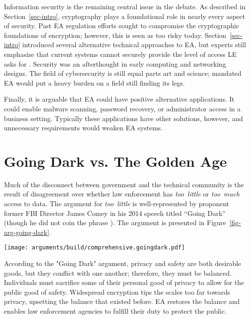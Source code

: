 \documentclass[conference]{IEEEtran}
\def\ii#1{\mbox{\textit{#1}}}
\newcommand{\myfig}[1]{Figure~\ref{#1}}
\newcommand{\mysec}[1]{Section~\ref{#1}}
\begin{document}
Information security is the remaining central issue in the debate. As described in \mysec{sec-intro}, \ac{cryptography}
plays a foundational role in nearly every aspect of security. Past \ac{EA} regulation efforts sought to compromise the
cryptographic foundations of encryption; however, this is seen as too risky today. \mysec{sec-intro} introduced several
alternative technical approaches to \ac{EA}, but experts still emphasize that current systems cannot securely provide
the level of access \acl{LE} asks for \cite{abelson_2015} \cite{abelson_risks_1997}. Security was an afterthought in
early computing and networking designs. The field of cybersecurity is still equal parts art and science; mandated
\ac{EA} would put a heavy burden on a field still finding its legs.


Finally, it is arguable that \ac{EA} could have positive alternative applications. It could enable malware scanning,
password recovery, or administrator access in a business setting. Typically these applications have other solutions,
however, and unnecessary requirements would weaken \ac{EA} systems.


\section{Going Dark vs. The Golden Age}

Much of the disconnect between government and the technical community is the result of disagreement over whether law
enforcement has \ii{too little} or \ii{too much} access to data. The argument for \ii{too little} is well-represented by
proponent former \ac{FBI} Director James Comey in his 2014 speech titled ``Going Dark'' \cite{comey_2014} (though he did
not coin the phrase \cite{swire_encryption_2011}). The argument is presented in \myfig{fig-arg-going-dark}.

\begin{figure*}[t!]
  \centering
  \texttt{[image: arguments/build/comprehensive.goingdark.pdf]}
  \caption{A ``Going Dark'' Argument Map}
  \label{fig-arg-going-dark}
\end{figure*}

According to the "Going Dark" argument, privacy and safety are both desirable goods, but they conflict with one another;
therefore, they must be balanced. Individuals must sacrifice some of their personal good of privacy to allow for the
public good of safety. Widespread encryption tips the scales too far towards privacy, upsetting the balance that existed
before. \ac{EA} restores the balance and enables law enforcement agencies to fulfill their duty to protect the public.
\end{document}
